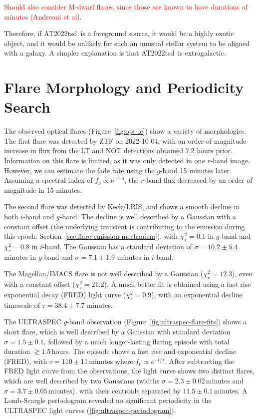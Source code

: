\documentclass{nature_plusfigure}
\newcommand{\at}{AT2022tsd}
\begin{document}
\begin{methods}
\textcolor{red}{Should also consider M-dwarf flares, since those are known to have durations of minutes (Andreoni et al)}.

Therefore, if \at\ is a foreground source, it would be a highly exotic object, and it would be unlikely for such an unusual stellar system to be aligned with a galaxy. A simpler explanation is that \at\ is extragalactic.

\section{Flare Morphology and Periodicity Search}
\label{sec:flare-morphology}

The observed optical flares (Figure~\ref{fig:opt-lc}) show a variety of morphologies. The first flare was detected by ZTF on 2022-10-04, with an order-of-magnitude increase in flux from the LT and NOT detections obtained 7.2 hours prior. Information on this flare is limited, as it was only detected in one $r$-band image. However, we can estimate the fade rate using the $g$-band 15 minutes later. Assuming a spectral index of $f_\nu \propto \nu^{-1.6}$, the $r$-band flux decreased by an order of magnitude in 15 minutes.

The second flare was detected by Keck/LRIS, and shows a smooth decline in both $i$-band and $g$-band. The decline is well described by a Gaussian with a constant offset (the underlying transient is contributing to the emission during this epoch; Section~\ref{sec:flare-emission-mechanism}), with $\chi^2_r=0.1$ in $g$-band and $\chi^2_r=0.8$ in $i$-band. The Gaussian has a standard deviation of $\sigma=10.2\pm5.4$ minutes in $g$-band and $\sigma=7.1\pm1.9$ minutes in $i$-band.

The Magellan/IMACS flare is not well described by a Gaussian ($\chi^2_r=12.3$), even with a constant offset ($\chi^2_r=21.2$). A much better fit is obtained using a fast rise exponential decay (FRED) light curve ($\chi^2_r=0.9$), with an exponential decline timescale of $\tau=38.4\pm7.7$ minutes. 

The ULTRASPEC $g$-band observation (Figure~\ref{fig:ultraspec-flare-fits}) shows a short flare, which is well described by a Gaussian with standard deviation $\sigma=1.5\pm0.1$, followed by a much longer-lasting flaring episode with total duration $\gtrsim1.5\,$hours. The episode shows a fast rise and exponential decline (FRED), with $\tau=110\pm11\,$minutes where $f_\nu\propto e^{-t/\tau}$. After subtracting the FRED light curve from the observations, the light curve shows two distinct flares, which are well described by two Gaussians (widths $\sigma=2.3\pm0.02\,$minutes and $\sigma=3.7\pm0.05\,$minutes), with their centroids separated by $11.5\pm0.1$\,minutes. A Lomb-Scargle periodogram\cite{Lomb1976,Scargle1982} revealed no significant periodicity in the ULTRASPEC light curves (\ref{fig:ultraspec-periodogram}).


\end{methods}
\end{document}
